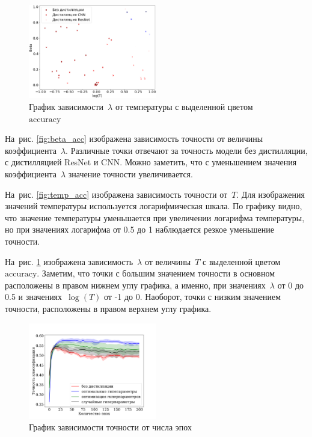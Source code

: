 \documentclass[12pt, twoside]{article}
\begin{document}
\begin{figure}[!ht]
\centering
\includegraphics[width=0.5\textwidth]{scatter_temp_beta.eps}
\caption{График зависимости~$\lambda$ от температуры с выделенной цветом~$\text{accuracy}$}
\label{fig:temp_beta}
\end{figure}

На~рис. \ref{fig:beta_acc} изображена зависимость точности от величины коэффициента~$\lambda$. Различные точки отвечают за точность модели без дистилляции, с дистилляцией ResNet и CNN. Можно заметить, что с уменьшением значения коэффициента~$\lambda$ значение точности увеличивается.

На~рис. \ref{fig:temp_acc} изображена зависимость точности от~$T$. Для изображения значений температуры используется логарифмическая шкала. По графику видно, что значение температуры уменьшается при увеличении логарифма температуры, но при значениях логарифма от 0.5 до 1 наблюдается резкое уменьшение точности.

На~рис. \ref{fig:temp_beta} изображена зависимость~$\lambda$ от величины~$T$ с выделенной цветом~$\text{accuracy}$. Заметим, что точки с большим значением точности в основном расположены в правом нижнем углу графика, а именно, при значениях~$\lambda$ от 0 до 0.5 и значениях~$\log(T)$ от -1 до 0. Наоборот, точки с низким значением точности, расположены в правом верхнем углу графика.

\begin{figure}[!ht]
\centering
\includegraphics[width=0.5\textwidth]{slides/acc.pdf}
\caption{График зависимости точности от числа эпох}
\label{fig:acc_epoch}
\end{figure}
\end{document}
